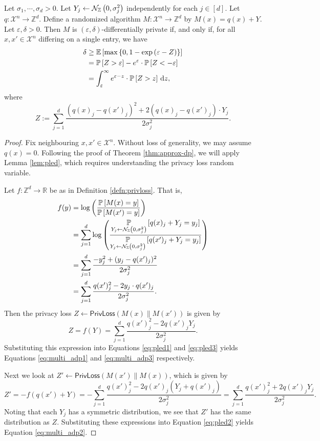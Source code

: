 \documentclass{jpcfinal} %
\newcommand{\dgausss}[2]{{\discN\left(#1,#2\right)}}
\newcommand{\dgauss}[1]{\dgausss{0}{#1}}
\newcommand{\ex}[2]{{\ifx&#1& \mathbb{E} \else
\underset{#1}{\mathbb{E}} \fi \left[#2\right]}}
\newcommand{\pr}[2]{{\ifx&#1& \mathbb{P} \else
\underset{#1}{\mathbb{P}} \fi \left[#2\right]}}
\newcommand{\eps}{\varepsilon}
\newcommand{\privloss}[2]{\mathsf{PrivLoss}\left(#1\middle\|#2\right)}
\newcommand{\dx}[1][x]{\mathrm{d}#1}
\newcommand{\Z}{\mathbb{Z}}
\newcommand{\R}{\mathbb{R}}
\begin{document}
\begin{thm}
\label{thm:priv3}
Let $\sigma_1, \cdots, \sigma_d >0$. Let $Y_j \gets \dgauss{\sigma_j^2}$ independently for each $j \in [d]$. Let $q\colon \mathcal{X}^n \to \Z^d$. Define a randomized algorithm $M\colon \mathcal{X}^n \to \Z^d$ by $M(x) = q(x)+Y$. Let $\eps,\delta>0$. Then $M$ is $(\eps,\delta)$-differentially private if, and only if, for all $x,x' \in \mathcal{X}^n$ differing on a single entry, we have
\begin{align}
    \delta &\ge \ex{}{\max\left\{ 0 , 1 - \exp\left(\eps - Z \right) \right\}}\label{eq:multi_adp1}\\
    &= \pr{}{Z > \eps} - e^\eps \cdot \pr{}{Z < -\eps}\label{eq:multi_adp2}\\
    &=  \int_\eps^\infty e^{\eps-z} \cdot \pr{}{Z>z} ~\dx[z] \label{eq:multi_adp3},
\end{align}
where 
\begin{equation}
    Z := \sum_{j=1}^d \frac{(q(x)_j-q(x')_j)^2 + 2 (q(x)_j-q(x')_j) \cdot Y_j}{2\sigma_j^2}.
\end{equation}
\end{thm}
\begin{proof}
    Fix neighbouring $x,x' \in \mathcal{X}^n$. Without loss of generality, we may assume $q(x)=0$.
    Following the proof of Theorem \ref{thm:approx-dp}, we will apply Lemma \ref{lem:pled}, which requires understanding the privacy loss random variable.
    
    Let $f\colon \Z^d \to \R$ be as in Definition \ref{defn:privloss}. That is,
    \begin{align*}
        f(y) &= \log\left(\frac{\pr{}{M(x)=y}}{\pr{}{M(x')=y}}\right)\\
        &= \sum_{j=1}^d \log\left(\frac{\pr{Y_j \gets \dgauss{\sigma_j^2}}{q(x)_j+Y_j=y_j}}{\pr{Y_j \gets \dgauss{\sigma_j^2}}{q(x')_j+Y_j=y_j}}\right)\\
        &= \sum_{j=1}^d \frac{-y_j^2 + (y_j-q(x')_j)^2}{2\sigma_j^2}\\
        &= \sum_{j=1}^d \frac{q(x')_j^2 - 2 y_j \cdot q(x')_j}{2\sigma_j^2}.
    \end{align*}
    Then the privacy loss $Z \gets \privloss{M(x)}{M(x')}$ is given by \[Z=f(Y)= \sum_{j=1}^d \frac{q(x')_j^2-2q(x')_j Y_j}{2\sigma_j^2}.\]
    Substituting this expression into Equations \ref{eq:pled1} and \ref{eq:pled3} yields Equations \ref{eq:multi_adp1} and \ref{eq:multi_adp3} respectively.
    
    Next we look at $Z' \gets \privloss{M(x')}{M(x)}$, which is given by \[Z' = -f(q(x')+Y) = -\sum_{j=1}^d \frac{q(x')_j^2 - 2 q(x')_j (Y_j+q(x')_j)}{2\sigma_j^2} = \sum_{j=1}^d \frac{q(x')_j^2 + 2 q(x')_j Y_j}{2\sigma_j^2}.\]
    Noting that each $Y_j$ has a symmetric distribution, we see that $Z'$ has the same distribution as $Z$.
    Substituting these expressions into Equation \ref{eq:pled2} yields Equation \ref{eq:multi_adp2}.
\end{proof}
\end{document}
